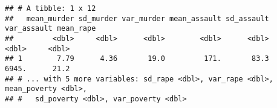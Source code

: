 \documentclass[]{article}
\newenvironment{Shaded}{\begin{snugshade}}{\end{snugshade}}
\newcommand{\CommentTok}[1]{\textcolor[rgb]{0.56,0.35,0.01}{\textit{#1}}}
\newcommand{\DataTypeTok}[1]{\textcolor[rgb]{0.13,0.29,0.53}{#1}}
\newcommand{\KeywordTok}[1]{\textcolor[rgb]{0.13,0.29,0.53}{\textbf{#1}}}
\newcommand{\NormalTok}[1]{#1}
\newcommand{\OperatorTok}[1]{\textcolor[rgb]{0.81,0.36,0.00}{\textbf{#1}}}
\newcommand{\StringTok}[1]{\textcolor[rgb]{0.31,0.60,0.02}{#1}}
\begin{document}
\begin{Shaded}
\end{Shaded}

\begin{verbatim}
## # A tibble: 1 x 12
##   mean_murder sd_murder var_murder mean_assault sd_assault var_assault mean_rape
##         <dbl>     <dbl>      <dbl>        <dbl>      <dbl>       <dbl>     <dbl>
## 1        7.79      4.36       19.0         171.       83.3       6945.      21.2
## # ... with 5 more variables: sd_rape <dbl>, var_rape <dbl>, mean_poverty <dbl>,
## #   sd_poverty <dbl>, var_poverty <dbl>
\end{verbatim}

\begin{Shaded}
\end{Shaded}
\end{document}
